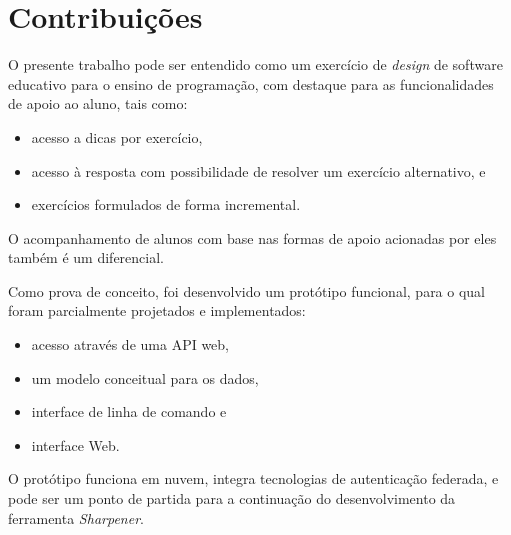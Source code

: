 \label{chapter:conclusao}
\section{Contribuições}
O presente trabalho pode ser entendido como um exercício de \emph{design} de software educativo para o ensino de programação, com destaque para as funcionalidades de apoio ao aluno, tais como: 
\begin{itemize}
    \item acesso a dicas por exercício, 
    \item acesso à resposta com possibilidade de resolver um exercício alternativo, e 
    \item exercícios formulados de forma incremental.
\end{itemize}
O acompanhamento de alunos com base nas formas de apoio acionadas por eles também é um diferencial.

Como prova de conceito, foi desenvolvido um protótipo funcional, para o qual foram parcialmente projetados e implementados: 
\begin{itemize}
    \item acesso através de uma API web, 
    \item um modelo conceitual para os dados, 
    \item interface de linha de comando e 
    \item interface Web.
\end{itemize}
O protótipo funciona em nuvem, integra tecnologias de autenticação federada,
e pode ser um ponto de partida para a continuação do desenvolvimento da
ferramenta \emph{Sharpener}.
